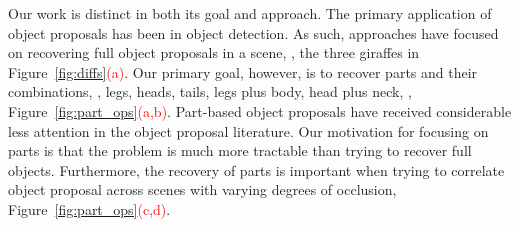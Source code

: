 Our work is distinct in both its goal and approach. The primary application of object proposals has been in object detection. As such, approaches have focused on recovering full object proposals in a scene, \ie, the three giraffes in Figure~\ref{fig:diffs}\textcolor{red}{(a)}. Our primary goal, however, is to recover parts and their combinations, \ie, legs, heads, tails, legs plus body, head plus neck, \etc, Figure~\ref{fig:part_ops}\textcolor{red}{(a,b)}. Part-based object proposals have received considerable less attention in the object proposal literature. Our motivation for focusing on parts is that the problem is much more tractable than trying to recover full objects. Furthermore, the recovery of parts is important when trying to correlate object proposal across scenes with varying degrees of occlusion, Figure~\ref{fig:part_ops}\textcolor{red}{(c,d)}. 





